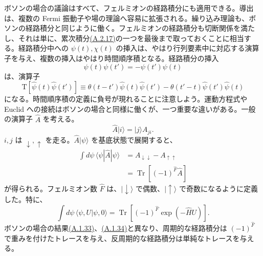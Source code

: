 ボソンの場合の議論はすべて、フェルミオンの経路積分にも適用できる。導出は、複数の Fermi 振動子や場の理論へ容易に拡張される。繰り込み理論も、ボソンの経路積分と同じように働く。フェルミオンの経路積分も切断関係を満たし、それは単に、累次積分\hyperref[eq:A.2.17]{(A.2.17)}の一つを最後まで取っておくことに相当する。経路積分中への $\psi(t),\chi(t)$ の挿入は、やはり行列要素中に対応する演算子を与え、複数の挿入はやはり時間順序積となる。経路積分の挿入
\begin{equation}
\psi(t)\psi(t')=-\psi(t')\psi(t)
\tag{A.2.19}\label{eq:A.2.19}
\end{equation}
は、演算子
\begin{equation}
\mathrm T[\hat\psi(t)\hat\psi(t')]
\equiv\theta(t-t')\hat\psi(t)\hat\psi(t')
-\theta(t'-t)\hat\psi(t')\hat\psi(t)
\tag{A.2.20}\label{eq:A.2.20}
\end{equation}
になる。時間順序積の定義に負号が現れることに注意しよう。運動方程式や Euclid への接続はボソンの場合と同様に働くが、一つ重要な違いがある。一般の演算子 $\hat A$ を考える。
\begin{equation}
\hat A|i\rangle=|j\rangle A_{ji}.
\tag{A.2.21}\label{eq:A.2.21}
\end{equation}
$i,j$ は $\downarrow,\uparrow$ を走る。$\hat A|\psi\rangle$ を基底状態で展開すると、
\begin{equation}
\begin{aligned}
\int d\psi\,\langle\psi|\hat A|\psi\rangle
&=A_{\downarrow\downarrow}-A_{\uparrow\uparrow}\\
&=\operatorname{Tr}[(-1)^{\hat F}\hat A]
\end{aligned}
\tag{A.2.22}\label{eq:A.2.22}
\end{equation}
が得られる。フェルミオン数 $\hat F$ は、$\lvert\downarrow\rangle$ で偶数、$\lvert\uparrow\rangle$ で奇数になるように定義した。特に、
\begin{equation}
\int d\psi\,\langle\psi,U|\psi,0\rangle
=\operatorname{Tr}[(-1)^{\hat F}\exp(-\hat HU)].
\tag{A.2.23}\label{eq:A.2.23}
\end{equation}
ボソンの場合の結果\hyperref[eq:A.1.33]{(A.1.33)}、\hyperref[eq:A.1.34]{(A.1.34)}と異なり、周期的な経路積分は $(-1)^{\hat F}$ で重みを付けたトレースを与え、反周期的な経路積分は単純なトレースを与える。

